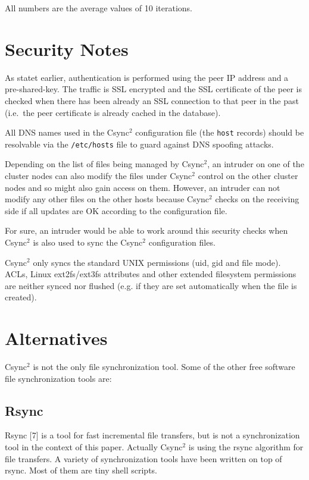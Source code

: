 \documentclass[a4paper,twocolumn]{article}
\def\csync2{{\sc Csync$^{2}$}}
\begin{document}
All numbers are the average values of 10 iterations.

\section{Security Notes}

As statet earlier, authentication is performed using the peer IP address and a
pre-shared-key. The traffic is SSL encrypted and the SSL certificate of the
peer is checked when there has been already an SSL connection to that peer in
the past (i.e.~the peer certificate is already cached in the database).

All DNS names used in the \csync2 configuration file (the {\tt host} records)
should be resolvable via the {\tt /etc/hosts} file to guard against DNS
spoofing attacks.

Depending on the list of files being managed by \csync2, an intruder on one of
the cluster nodes can also modify the files under \csync2 control on the other
cluster nodes and so might also gain access on them. However, an intruder can
not modify any other files on the other hosts because \csync2 checks on the
receiving side if all updates are OK according to the configuration file.

For sure, an intruder would be able to work around this security checks when
\csync2 is also used to sync the \csync2 configuration files.

\csync2 only syncs the standard UNIX permissions (uid, gid and file mode).
ACLs, Linux ext2fs/ext3fs attributes and other extended filesystem permissions
are neither synced nor flushed (e.g. if they are set automatically when
the file is created).

\section{Alternatives}

\csync2 is not the only file synchronization tool. Some of the other
free software file synchronization tools are:

\subsection{Rsync}

Rsync [7] is a tool for fast incremental file transfers, but is not a
synchronization tool in the context of this paper. Actually \csync2 is
using the rsync algorithm for file transfers. A variety of synchronization
tools have been written on top of rsync. Most of them are tiny shell scripts.
\end{document}
